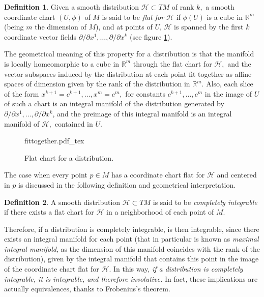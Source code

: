 \documentclass[12pt, letterpaper, reqno]{amsart}
\newcommand{\incfig}[2][1]{%
    \def\svgwidth{#1\columnwidth}
    {#2.pdf_tex}
}
\theoremstyle{definition}
\newtheorem{df}{Definition}
\theoremstyle{plain}
\theoremstyle{remark}
\begin{document}
\begin{df}
	Given a smooth distribution $ \mathcal{H}\subset TM $  of rank $ k, $ a smooth coordinate chart $ (U,\phi) $ of $ M $ is said to be \textit{flat for $ \mathcal{H} $ } if $ \phi(U) $ is a cube in $ \mathbb{R}^m  $ (being $ m $ the dimension of $ M $), and at points of $ U $, $ \mathcal{H} $ is spanned by the first $ k $ coordinate vector fields $ \partial/\partial x^1,\dots,\partial/\partial x^k $ (see figure \ref{fig:fittogether}).
\end{df}
The geometrical meaning of this property for a distribution is that the manifold is locally homeomorphic to a cube in $ \mathbb{R}^m  $ through the flat chart for $ \mathcal{H}, $  and the vector subspaces induced by the distribution at each point fit together as affine spaces of dimension given by the rank of the distribution in $ \mathbb{R}^m $. Also, each slice of the form $ x^{k+1}=c^{k+1},\dots, x^m=c^m,$ for constants $ c^{k+1}, \dots, c^m $ in the image of $ U $ of such a chart is an integral manifold of the distribution generated by $ \partial/\partial x^1,\dots,\partial/\partial x^k $, and the preimage of this integral manifold is an integral manifold of $ \mathcal{H}, $ contained in $ U. $  

\begin{figure}
    \centering
    \incfig{fittogether}
    \caption{Flat chart for a distribution.}
    \label{fig:fittogether}
\end{figure}

The case when every point $p\in M $ has a coordinate chart flat for $ \mathcal{H} $ and centered in $ p $ is discussed in the following definition and geometrical interpretation.

\begin{df}
	A smooth distribution $ \mathcal{H}\subset TM $  is said to be \textit{completely integrable} if there exists a flat chart for $ \mathcal{H} $ in a neighborhood of each point of $ M. $ 
\end{df}

Therefore, if a distribution is completely integrable, is then integrable, since there exists an integral manifold for each point (that in particular is known as \textit{maximal integral manifold}, as the dimension of this manifold coincides with the rank of the distribution), given by the integral manifold that contains this point in the image of the coordinate chart flat for $ \mathcal{H}. $ In this way, \textit{ if a distribution is completely integrable, it is integrable, and therefore involutive.} In fact, these implications are actually equivalences, thanks to Frobenius's theorem.
\end{document}
